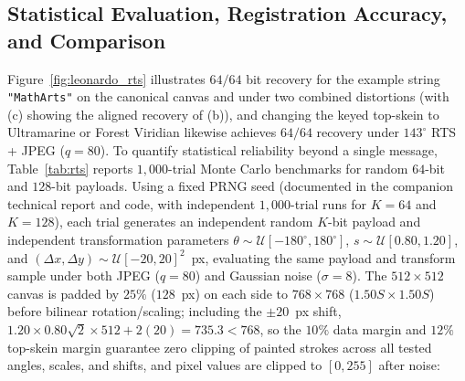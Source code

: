 \documentclass[]{interact}
\theoremstyle{plain}
\theoremstyle{definition}
\theoremstyle{remark}
\begin{document}
\subsection{Statistical Evaluation, Registration Accuracy, and Comparison}
Figure~\ref{fig:leonardo_rts} illustrates $64/64$ bit recovery for the example string \texttt{"MathArts"} on the canonical canvas and under two combined distortions (with (c) showing the aligned recovery of (b)), and changing the keyed top-skein to Ultramarine or Forest Viridian likewise achieves $64/64$ recovery under $143^\circ$ RTS + JPEG ($q=80$). To quantify statistical reliability beyond a single message, Table~\ref{tab:rts} reports $1{,}000$-trial Monte Carlo benchmarks for random $64$-bit and $128$-bit payloads. Using a fixed PRNG seed (documented in the companion technical report and code, with independent $1{,}000$-trial runs for $K=64$ and $K=128$), each trial generates an independent random $K$-bit payload and independent transformation parameters $\theta \sim \mathcal{U}[-180^\circ, 180^\circ]$, $s \sim \mathcal{U}[0.80, 1.20]$, and $(\Delta x, \Delta y) \sim \mathcal{U}[-20, 20]^2$~px, evaluating the same payload and transform sample under both JPEG ($q=80$) and Gaussian noise ($\sigma=8$). The $512 \times 512$ canvas is padded by $25\%$ ($128$~px) on each side to $768 \times 768$ ($1.50S \times 1.50S$) before bilinear rotation/scaling; including the $\pm 20$~px shift, $1.20 \times 0.80\sqrt{2} \times 512 + 2(20) = 735.3 < 768$, so the $10\%$ data margin and $12\%$ top-skein margin guarantee zero clipping of painted strokes across all tested angles, scales, and shifts, and pixel values are clipped to $[0, 255]$ after noise:
\end{document}
